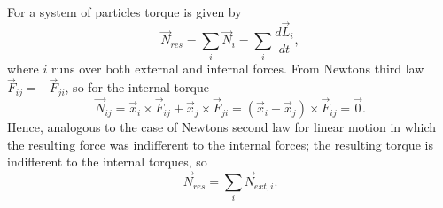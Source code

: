 For a system of particles torque is given by
\begin{equation}
	\vec{N}_{res}=\sum_i\vec{N}_i=\sum_i\frac{d\vec{L}_i}{dt},
\end{equation} 
where $i$ runs over both external and internal forces. From Newtons third law $\vec{F}_{ij}=-\vec{F}_{ji}$, so for the internal torque
\begin{equation}
	\vec{N}_{ij}=\vec{x}_i\times \vec{F}_{ij}+\vec{x}_j\times \vec{F}_{ji}=(\vec{x}_i-\vec{x}_j)\times \vec{F}_{ij}=\vec{0}.
\end{equation} 
Hence, analogous to the case of Newtons second law for linear motion in which the resulting force was indifferent to the internal forces; the resulting torque is indifferent to the internal torques, so
\begin{equation}
	\vec{N}_{res}=\sum_{i}\vec{N}_{ext,i}.
\end{equation} 

